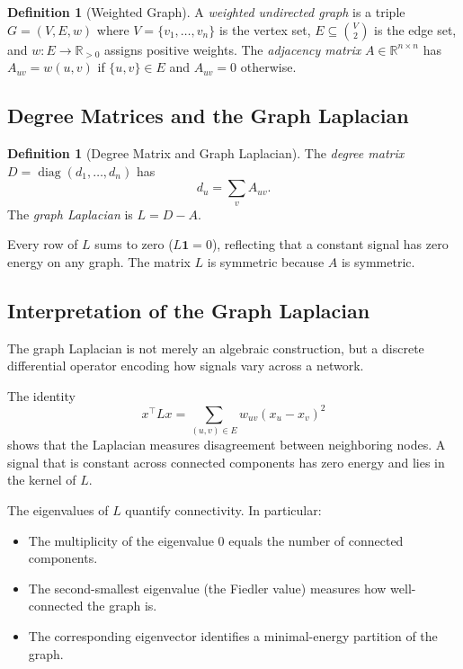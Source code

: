 \documentclass[11pt]{article}
\theoremstyle{definition}
\newtheorem{definition}[theorem]{Definition}
\theoremstyle{remark}
\newcommand{\R}{\mathbb{R}}
\DeclareMathOperator{\diag}{diag}
\begin{document}
\begin{definition}[Weighted Graph]
A \emph{weighted undirected graph} is a triple $G = (V, E, w)$ where
$V = \{v_1,\dots,v_n\}$ is the vertex set, $E \subseteq \binom{V}{2}$ is the
edge set, and $w\colon E \to \R_{>0}$ assigns positive weights. The
\emph{adjacency matrix} $A \in \R^{n\times n}$ has $A_{uv} = w(u,v)$ if
$\{u,v\}\in E$ and $A_{uv}=0$ otherwise.
\end{definition}

\subsection{Degree Matrices and the Graph Laplacian}

\begin{definition}[Degree Matrix and Graph Laplacian]
The \emph{degree matrix} $D = \diag(d_1,\dots,d_n)$ has
\[
  d_u = \sum_v A_{uv}.
\]
The \emph{graph Laplacian} is $L = D - A$.
\end{definition}

Every row of $L$ sums to zero ($L\mathbf{1}=0$), reflecting that a constant
signal has zero energy on any graph. The matrix $L$ is symmetric because $A$ is
symmetric.

\subsection{Interpretation of the Graph Laplacian}

The graph Laplacian is not merely an algebraic construction, but a discrete differential operator encoding how signals vary across a network.

The identity
\[
x^\top L x = \sum_{(u,v) \in E} w_{uv}(x_u - x_v)^2
\]
shows that the Laplacian measures disagreement between neighboring nodes. A signal that is constant across connected components has zero energy and lies in the kernel of $L$.

The eigenvalues of $L$ quantify connectivity. In particular:
\begin{itemize}
    \item The multiplicity of the eigenvalue $0$ equals the number of connected components.
    \item The second-smallest eigenvalue (the Fiedler value) measures how well-connected the graph is.
    \item The corresponding eigenvector identifies a minimal-energy partition of the graph.
\end{itemize}
\end{document}
